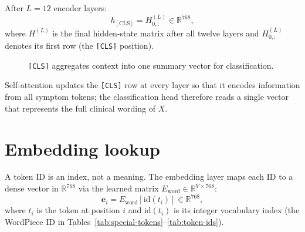 After \(L=12\) encoder layers:
\begin{equation}
  h_{\mathrm{[CLS]}} = H^{(L)}_{0,:} \in \mathbb{R}^{768},
\end{equation}
where \(H^{(L)}\) is the final hidden-state matrix after all twelve layers and \(H^{(L)}_{0,:}\) denotes its first row (the \texttt{[CLS]} position).

\begin{figure}[H]
\centering
{}
\caption{\texttt{[CLS]} aggregates context into one summary vector for classification.}
\label{fig:cls-diagram}
\end{figure}

Self-attention updates the \texttt{[CLS]} row at every layer so that it encodes information from all symptom tokens; the classification head therefore reads a single vector that represents the full clinical wording of \(X\).

\section{Embedding lookup}
\label{sec:embeddings}

A token ID is an index, not a meaning. The embedding layer maps each ID to a dense vector in \(\mathbb{R}^{768}\) via the learned matrix \(E_{\mathrm{word}} \in \mathbb{R}^{V \times 768}\):
\begin{equation}
  \mathbf{e}_i = E_{\mathrm{word}}[\mathrm{id}(t_i)] \in \mathbb{R}^{768},
\end{equation}
where \(t_i\) is the token at position \(i\) and \(\mathrm{id}(t_i)\) is its integer vocabulary index (the WordPiece ID in Tables~\ref{tab:special-tokens}--\ref{tab:token-ids}).

